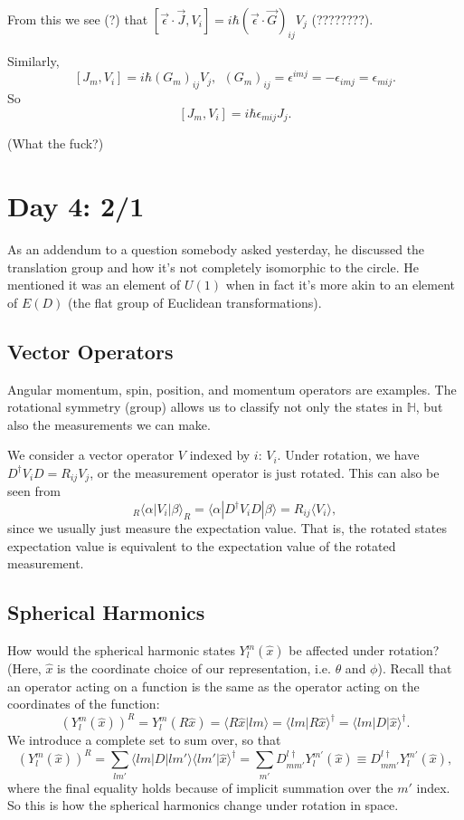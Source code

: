 \documentclass[fontsize=12pt]{scrartcl}
\newcommand{\bb}[1]{\mathbb{#1}}
\newcommand{\la}{\langle}
\newcommand{\ra}{\rangle}
\newcommand{\pos}{\hat{x}}
\begin{document}
From this we see (?) that $[\vec{\epsilon}\cdot\vec{J}, V_i]=i\hbar (\vec{\epsilon}\cdot \vec{G})_{ij} V_j$ (????????).

Similarly, $$[J_m, V_i]=i\hbar (G_m)_{ij}V_j, \ \ (G_m)_{ij}=\epsilon^{imj}=-\epsilon_{imj}=\epsilon_{mij}.$$ So $$[J_m, V_i]=i\hbar \epsilon_{mij}J_j.$$

(What the fuck?)






\section{Day 4: 2/1}


As an addendum to a question somebody asked yesterday, he discussed the translation group and how it's not completely isomorphic to the circle. He mentioned it was an element of $U(1)$ when in fact it's more akin to an element of $E(D)$ (the flat group of Euclidean transformations).


\subsection{Vector Operators}

Angular momentum, spin, position, and momentum operators are examples. The rotational symmetry (group) allows us to classify not only the states in $\bb{H}$, but also the measurements we can make.

We consider a vector operator $V$ indexed by $i$: $V_i$. Under rotation, we have $D^\dagger V_i D=R_{ij}V_j$, or the measurement operator is just rotated. This can also be seen from $$_R\la \alpha|V_i|\beta\ra_R = \la \alpha|D^\dagger V_iD|\beta\ra = R_{ij}\la V_i \ra,$$ since we usually just measure the expectation value. That is, the rotated states expectation value is equivalent to the expectation value of the rotated measurement.


\subsection{Spherical Harmonics}

How would the spherical harmonic states $Y_l^m(\pos)$ be affected under rotation? (Here, $\pos$ is the coordinate choice of our representation, i.e. $\theta$ and $\phi$). Recall that an operator acting on a function is the same as the operator acting on the coordinates of the function: $$\left(Y_l^m(\pos)\right)^R = Y_l^m(R\pos)=\la R\pos|lm\ra = \la lm|R\pos\ra^\dagger=\la lm |D|\pos\ra ^\dagger.$$ We introduce a complete set to sum over, so that $$\left(Y_l^m(\pos)\right)^R = \sum_{lm'} \la lm|D|lm'\ra \la lm'|\pos\ra^\dagger=\sum_{m'}D_{mm'}^{l\dagger}Y_l^{m'}(\pos)\equiv D_{mm'}^{l\dagger}Y_l^{m'}(\pos),$$ where the final equality holds because of implicit summation over the $m'$ index. So this is how the spherical harmonics change under rotation in space.
\end{document}
